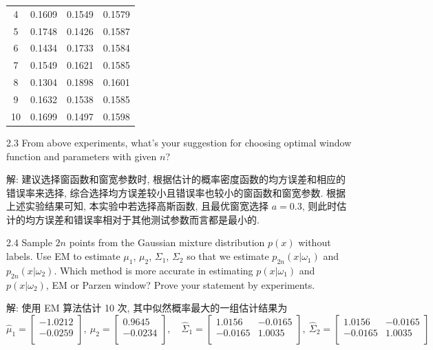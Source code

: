 \documentclass{article}
\begin{document}
\begin{table}[htbp]
\begin{minipage}{0.4\textwidth}
\begin{tabular}{c|ccc}
      4  & 0.1609 & 0.1549 & 0.1579 \\
      5  & 0.1748 & 0.1426 & 0.1587 \\
      6  & 0.1434 & 0.1733 & 0.1584 \\
      7  & 0.1549 & 0.1621 & 0.1585 \\
      8  & 0.1304 & 0.1898 & 0.1601 \\
      9  & 0.1632 & 0.1538 & 0.1585 \\
      10 & 0.1699 & 0.1497 & 0.1598 \\
      \hline
    \end{tabular}
  \end{minipage}
\end{table}

2.3 From above experiments, what's your suggestion for choosing optimal window function and parameters with given $n$?

解: 建议选择窗函数和窗宽参数时, 根据估计的概率密度函数的均方误差和相应的错误率来选择, 综合选择均方误差较小且错误率也较小的窗函数和窗宽参数. 根据上述实验结果可知, 本实验中若选择高斯函数, 且最优窗宽选择 $a=0.3$, 则此时估计的均方误差和错误率相对于其他测试参数而言都是最小的.

2.4 Sample $2n$ points from the Gaussian mixture distribution $p(x)$ without labels. Use EM to estimate $\mu_{1}$, $\mu_{2}$, $\Sigma_{1}$, $\Sigma_{2}$ so that we estimate $p_{2n}(x|\omega_{1})$ and $p_{2n}(x|\omega_{2})$. Which method is more accurate in estimating $p(x|\omega_{1})$ and $p(x|\omega_{2})$, EM or Parzen window? Prove your statement by experiments.

解: 使用 EM 算法估计 10 次, 其中似然概率最大的一组估计结果为
\begin{equation}
  \hat{\mu}_1=
    \begin{bmatrix}
      -1.0212 \\ 
      -0.0259 \\
    \end{bmatrix},~
  \hat{\mu}_2=
    \begin{bmatrix}
      0.9645 \\ 
      -0.0234 \\
    \end{bmatrix},\quad
  \hat{\Sigma}_1=
    \begin{bmatrix}
      1.0156 & -0.0165 \\
      -0.0165 & 1.0035 \\
    \end{bmatrix},~
  \hat{\Sigma}_2=
    \begin{bmatrix}
      1.0156 & -0.0165 \\
      -0.0165 & 1.0035 \\
    \end{bmatrix}
\end{equation}
\end{document}

